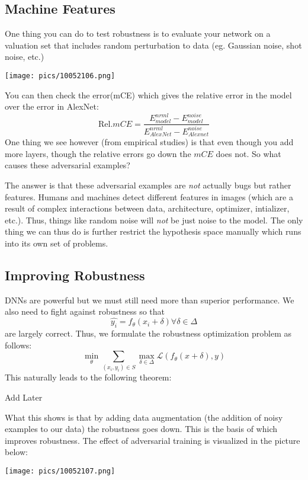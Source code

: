 \documentclass[11pt]{scrartcl}
\begin{document}
\subsection{Machine Features}
One thing you can do to test robustness is to evaluate your network on a valuation set that includes random perturbation to data (eg. Gaussian noise, shot noise, etc.)
\begin{center}
    \texttt{[image: pics/10052106.png]}
\end{center}

You can then check the error(mCE) which gives the relative error in the model over the error in AlexNet:
$$\text{Rel}.mCE=\frac{E^{nrml}_{model}-E^{noise}_{model}}{E^{nrml}_{AlexNet}-E^{noise}_{Alexnet}}$$
One thing we see however (from empirical studies) is that even though you add more layers, though the relative errors go down the $mCE$ does not. So what causes these adversarial examples?

The answer is that these adversarial examples are \textit{not} actually bugs but rather features. Humans and machines detect different features in images (which are a result of complex interactions between data, architecture, optimizer, intializer, etc.). Thus, things like random noise will \textit{not} be just noise to the model. The only thing we can thus do is further restrict the hypothesis space manually which runs into its own set of problems.

\subsection{Improving Robustness}

DNNs are powerful but we must still need more than superior performance. We also need to fight against robustness so that $$\hat{y_i}=f_{\theta}(x_i+\delta) \forall \delta \in \Delta$$
are largely correct. Thus, we formulate the robustness optimization problem as follows:
$$\min_{\theta}\sum_{(x_i,y_i) \in S}\max_{\delta \in \Delta}\mathcal{L}(f_\theta(x+\delta),y)$$
This naturally leads to the following theorem:
\begin{thm}
Add Later
\end{thm}

What this shows is that by adding data augmentation (the addition of noisy examples to our data) the robustness goes down. This is the basis of  which improves robustness. The effect of adversarial training is visualized in the picture below:
\begin{center}
    \texttt{[image: pics/10052107.png]}
\end{center}
\end{document}
